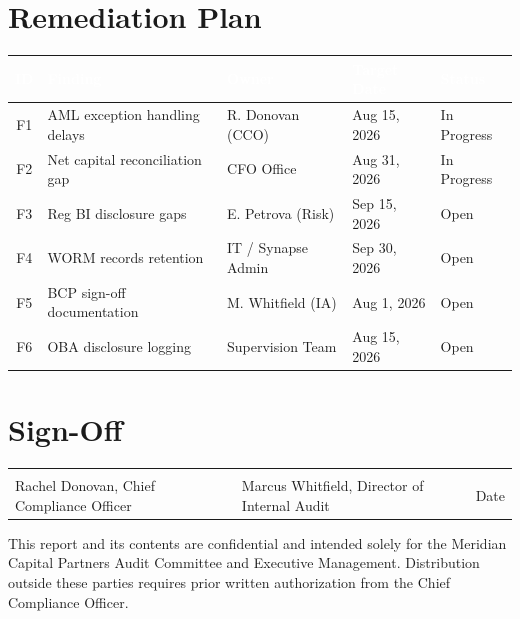 \documentclass[11pt,a4paper]{scrreprt}
\begin{document}
\section*{Remediation Plan}

\begin{center}
\begin{tabularx}{\linewidth}{@{}cXlll@{}}
\toprule
\rowcolor{auditnavy}
\textcolor{white}{\textbf{ID}} & \textcolor{white}{\textbf{Finding}} & \textcolor{white}{\textbf{Owner}} &
\textcolor{white}{\textbf{Target Date}} & \textcolor{white}{\textbf{Status}} \\
\midrule
F1 & AML exception handling delays & R. Donovan (CCO) & Aug 15, 2026 & \textcolor{riskhigh}{In Progress} \\
F2 & Net capital reconciliation gap & CFO Office & Aug 31, 2026 & \textcolor{riskhigh}{In Progress} \\
F3 & Reg BI disclosure gaps & E. Petrova (Risk) & Sep 15, 2026 & \textcolor{riskmed}{Open} \\
F4 & WORM records retention & IT / Synapse Admin & Sep 30, 2026 & \textcolor{riskmed}{Open} \\
F5 & BCP sign-off documentation & M. Whitfield (IA) & Aug 1, 2026 & \textcolor{risklow}{Open} \\
F6 & OBA disclosure logging & Supervision Team & Aug 15, 2026 & \textcolor{risklow}{Open} \\
\bottomrule
\end{tabularx}
\end{center}


\section*{Sign-Off}

\begin{center}
\renewcommand{\arraystretch}{1.3}
\begin{tabular}{p{5cm}p{5cm}p{4cm}}
\hrulefill & \hrulefill & \hrulefill \\
\footnotesize Rachel Donovan, Chief Compliance Officer & \footnotesize Marcus Whitfield, Director of Internal Audit & \footnotesize Date \\
\end{tabular}
\end{center}

\vspace{0.15cm}
\begin{center}
{\footnotesize\color{auditslate} This report and its contents are confidential and intended
solely for the Meridian Capital Partners Audit Committee and Executive Management. Distribution
outside these parties requires prior written authorization from the Chief Compliance Officer.}
\end{center}
\end{document}
